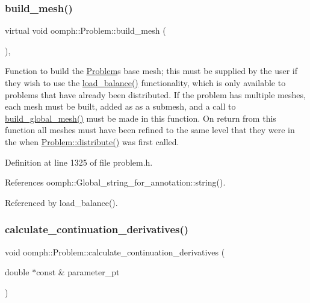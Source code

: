 \subsubsection{\texorpdfstring{build\+\_\+mesh()}{build\_mesh()}}
{\footnotesize\ttfamily virtual void oomph\+::\+Problem\+::build\+\_\+mesh (\begin{DoxyParamCaption}{ }\end{DoxyParamCaption})\hspace{0.3cm}{\ttfamily [inline]}, {\ttfamily [virtual]}}



Function to build the \hyperlink{classoomph_1_1Problem}{Problem}\textquotesingle{}s base mesh; this must be supplied by the user if they wish to use the \hyperlink{classoomph_1_1Problem_ad6309367fa379889012f25e3397ab425}{load\+\_\+balance()} functionality, which is only available to problems that have already been distributed. If the problem has multiple meshes, each mesh must be built, added as as a submesh, and a call to \hyperlink{classoomph_1_1Problem_a0faad6f705a6dc0ffe27229f9104ed7c}{build\+\_\+global\+\_\+mesh()} must be made in this function. On return from this function all meshes must have been refined to the same level that they were in the when \hyperlink{classoomph_1_1Problem_aa35e1adc0fdf14b217c7b608eb9cf20b}{Problem\+::distribute()} was first called. 



Definition at line 1325 of file problem.\+h.



References oomph\+::\+Global\+\_\+string\+\_\+for\+\_\+annotation\+::string().



Referenced by load\+\_\+balance().

\mbox{\label{classoomph_1_1Problem_a58f16ae8f6da042d40fddf01ee3ebd31}} 
\subsubsection{\texorpdfstring{calculate\+\_\+continuation\+\_\+derivatives()}{calculate\_continuation\_derivatives()}\hspace{0.1cm}{\footnotesize\ttfamily [1/2]}}
{\footnotesize\ttfamily void oomph\+::\+Problem\+::calculate\+\_\+continuation\+\_\+derivatives (\begin{DoxyParamCaption}\item[{double $\ast$const \&}]{parameter\+\_\+pt }\end{DoxyParamCaption})\hspace{0.3cm}{\ttfamily [protected]}}



